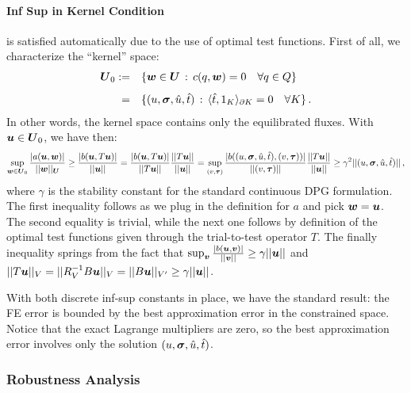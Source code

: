\documentclass[Proposal.tex]{subfiles}
\begin{document}
\paragraph{Inf Sup in Kernel Condition} is satisfied automatically due to the use of optimal
test functions. First of all, we characterize the ``kernel'' space:
\begin{equation}
\begin{array}{rl}
\boldsymbol U_0  := & \left\{  \boldsymbol w \in \boldsymbol U \, : \, c(q,\boldsymbol w) = 0 \quad \forall q \in Q \right\} \\[8pt]
 = &\{ (u,\boldsymbol\sigma,\hat{u},\hat{t}) \, : \, \langle \hat{t},1_K \rangle_{\partial K} = 0
 \quad \forall K \}\,.
\end{array}
\end{equation}
In other words, the kernel space contains only the equilibrated fluxes.
With $\boldsymbol u \in \boldsymbol U_0$, we have then:
\begin{equation}
   \sup_{\boldsymbol w \in \boldsymbol U_0} \frac{| a(\boldsymbol u,\boldsymbol w) |}{|| \boldsymbol w ||_{\boldsymbol U} }
   \geq \frac{| b(\boldsymbol u,T \boldsymbol u) |}{|| \boldsymbol u ||}
   = \frac{| b(\boldsymbol u,T \boldsymbol u) |}{|| T\boldsymbol u ||}\frac{||T\boldsymbol u||}{||\boldsymbol u||}
   = \sup_{(v,\boldsymbol\tau)}\frac{| b((u,\boldsymbol\sigma,\hat{u},\hat{t}), (v,\boldsymbol\tau)) |}{|| (v,\boldsymbol\tau) ||}
   \frac{||T\boldsymbol u||}{||\boldsymbol u||}
   \geq \gamma^2 || (u,\boldsymbol\sigma,\hat{u},\hat{t}) ||\,,
\end{equation}
where $\gamma$ is the stability constant for the standard continuous DPG formulation.
The first inequality follows as we plug in the definition for $a$ and pick
$\boldsymbol w=\boldsymbol u$. The second equality is trivial, while the next one follows by definition of the optimal test
functions given through the trial-to-test operator $T$. The finally inequality
springs from the fact that
$\sup_{\boldsymbol v}\frac{|b(\boldsymbol u,\boldsymbol v)|}{||\boldsymbol v||}\geq\gamma||\boldsymbol u||$ and
$||T\boldsymbol u||_V=||R_V^{-1}B\boldsymbol u||_V=||B\boldsymbol u||_{V'}\geq\gamma||\boldsymbol u||$.

With both discrete inf-sup constants in place, we have the standard result: the FE error
is bounded by the best approximation error in the constrained space. Notice that the exact Lagrange multipliers
are zero, so the best approximation error involves only the solution $(u,\boldsymbol\sigma,\hat{u},\hat{t})$.


\subsubsection{Robustness Analysis}
\label{sec:robustnessAnalysis}
\end{document}
